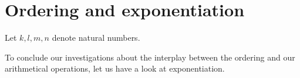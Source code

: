 \documentclass[../../arithmetic.ftl.tex]{subfiles}
\begin{document}
  \begin{comment}
    \begin{forthel}

    \end{forthel}
  \end{comment}


  \section{Ordering and exponentiation}

  \begin{forthel}
  \end{forthel}

  \begin{forthel}
  \end{forthel}

  \begin{forthel}
    Let $k, l, m, n$ denote natural numbers.
  \end{forthel}

  \noindent To conclude our investigations about the interplay between the
  ordering and our arithmetical operations, let us have a look at
  exponentiation.
\end{document}
